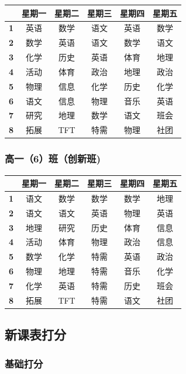 \documentclass[a4paper]{article}
\begin{document}
   \begin{tabular}{cccccc}
   \toprule
   & \bf 星期一 & \bf 星期二 & \bf 星期三 & \bf 星期四 & \bf 星期五 \\
   \midrule
   \bf 1 & 英语 & 数学 & 语文 & 英语 & 数学 \\
   \bf 2 & 数学 & 英语 & 语文 & 数学 & 语文 \\
   \bf 3 & 化学 & 历史 & 英语 & 体育 & 地理 \\
   \bf 4 & 活动 & 体育 & 政治 & 地理 & 政治 \\
   \midrule
   \bf 5 & 物理 & 信息 & 化学 & 历史 & 化学 \\
   \bf 6 & 语文 & 信息 & 物理 & 音乐 & 英语 \\
   \bf 7 & 研究 & 地理 & 数学 & 语文 & 班会 \\
   \bf 8 & 拓展 & TFT  & 特需 & 物理 & 社团 \\
   \bottomrule
   \end{tabular}

  \subsubsection{高一（6）班（创新班)}

   \begin{tabular}{cccccc}
   \toprule
   & \bf 星期一 & \bf 星期二 & \bf 星期三 & \bf 星期四 & \bf 星期五 \\
   \midrule
   \bf 1 & 语文 & 数学 & 数学 & 数学 & 地理 \\
   \bf 2 & 语文 & 语文 & 英语 & 物理 & 英语 \\
   \bf 3 & 地理 & 研究 & 历史 & 体育 & 信息 \\
   \bf 4 & 活动 & 体育 & 物理 & 政治 & 信息 \\
   \midrule
   \bf 5 & 数学 & 化学 & 特需 & 英语 & 政治 \\
   \bf 6 & 物理 & 地理 & 特需 & 音乐 & 化学 \\
   \bf 7 & 化学 & 英语 & 特需 & 历史 & 班会 \\
   \bf 8 & 拓展 & TFT  & 特需 & 语文 & 社团 \\
   \bottomrule
   \end{tabular}

 \clearpage

 \subsection{新课表打分}

  \subsubsection{基础打分}
\end{document}
